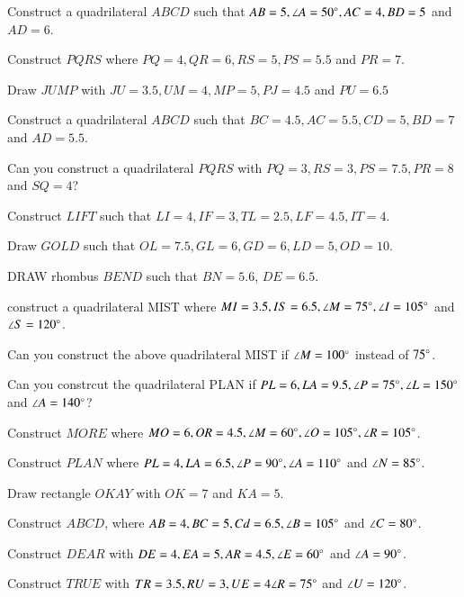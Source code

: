 

\item Construct a quadrilateral $ABCD$ such that $AB=5, \angle A = 50\degree, AC = 4, BD = 5$ and $AD = 6$.
\item Construct $PQRS$ where $PQ = 4, QR = 6, RS = 5, PS = 5.5$ and $PR = 7$.
\item Draw $JUMP$ with $JU = 3.5, UM=4, MP = 5, PJ =4.5$ and $PU = 6.5$
\item Construct a quadrilateral $ABCD$ such that $BC=4.5,  AC = 5.5, CD = 5, BD = 7$ and $AD = 5.5$.
\item Can you construct a quadrilateral $PQRS$ with $PQ=3, RS=3, PS=7.5, PR=8$ and $SQ=4$?
\item Construct $LIFT$ such that $LI = 4, IF = 3, TL = 2.5, LF = 4.5, IT=4$.
\item Draw $GOLD$ such that $OL=7.5, GL=6, GD=6, LD = 5, OD = 10$.
\item DRAW rhombus $BEND$ such that $BN = 5.6$, $DE = 6.5$.
\item construct a quadrilateral MIST where $MI = 3.5, IS = 6.5, \angle M = 75 \degree, \angle I = 105 \degree$ and $\angle S = 120 \degree$.
\item Can you construct the above quadrilateral MIST if $\angle M = 100 \degree$ instead of $75 \degree$.
\item Can you constrcut the quadrilateral PLAN if $PL = 6, LA = 9.5, \angle P = 75 \degree, \angle L = 150 \degree$ and $\angle A = 140 \degree$?
\item Construct $MORE$ where $MO = 6, OR = 4.5, \angle M = 60 \degree, \angle O = 105 \degree, \angle R = 105 \degree$.
\item Construct $PLAN$ where $PL = 4, LA = 6.5, \angle P = 90 \degree, \angle A = 110\degree$ and $\angle N = 85\degree$.
\item Draw  rectangle $OKAY$ with $OK = 7$ and $KA = 5$.
\item Construct $ABCD $, where $AB = 4, BC = 5, Cd = 6.5, \angle B = 105 \degree$ and $\angle C = 80\degree$.
\item Construct $DEAR$ with $DE = 4, EA = 5, AR = 4.5, \angle E = 60 \degree$ and $\angle A = 90 \degree$.\item Construct $TRUE$ with $TR = 3.5, RU = 3, UE = 4 \angle R = 75\degree$ and $\angle U = 120\degree$.

